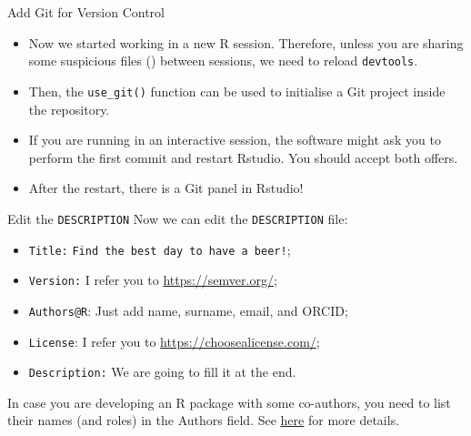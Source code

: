 \documentclass[
hyperref={bookmarks=false},
xcolor={dvipsnames,svgnames*,x11names*}, 
12pt
]{beamer}
\begin{document}
\begin{frame}[fragile]{Add Git for Version Control}
\vspace{-0.5cm}
\begin{itemize}
\itemsep 2ex
\item Now we started working in a new R session. Therefore, unless you are sharing some suspicious files () between sessions, we need to reload \texttt{devtools}.
\item Then, the \texttt{use\_git()} function can be used to initialise a Git project inside the repository. 
\item If you are running in an interactive session, the software might ask you to perform the first commit and restart Rstudio. You should accept both offers. 
\item After the restart, there is a Git panel in Rstudio! 
\end{itemize}
\end{frame}

\begin{frame}{Edit the \texttt{DESCRIPTION}}
\vspace{-0.5cm}
Now we can edit the \texttt{DESCRIPTION} file:
\begin{itemize}
\itemsep 1ex
\item \texttt{Title:} \texttt{Find the best day to have a beer!};
\item \texttt{Version:} I refer you to \url{https://semver.org/}; 
\item \texttt{Authors@R}: Just add name, surname, email, and ORCID; 
\item \texttt{License}: I refer you to \url{https://choosealicense.com/};
\item \texttt{Description:} We are going to fill it at the end.
\end{itemize}
In case you are developing an R package with some co-authors, you need to list their names (and roles) in the Authors field. See \href{https://r-pkgs.org/description.html\#sec-description-authors-at-r}{here} for more details. 
\end{frame}
\end{document}
